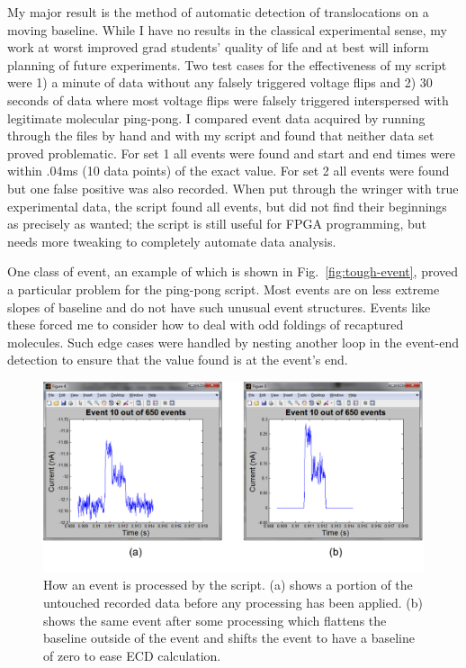 \documentclass[aps,prl,preprint,groupedaddress]{revtex4}
\begin{document}
My major result is the method of automatic detection of translocations on a moving baseline.
While I have no results in the classical experimental sense, my work at worst improved grad students' quality of life and at best will inform planning of future experiments.
Two test cases for the effectiveness of my script were 1) a minute of data without any falsely triggered voltage flips and 2) 30 seconds of data where most voltage flips were falsely triggered interspersed with legitimate molecular ping-pong.
I compared event data acquired by running through the files by hand and with my script and found that neither data set proved problematic.
For set 1 all events were found and start and end times were within .04ms (10 data points) of the exact value.
For set 2 all events were found but one false positive was also recorded.
When put through the wringer with true experimental data, the script found all events, but did not find their beginnings as precisely as wanted;
the script is still useful for FPGA programming, but needs more tweaking to completely automate data analysis.

One class of event, an example of which is shown in Fig.~\ref{fig:tough-event}, proved a particular problem for the ping-pong script.
Most events are on less extreme slopes of baseline and do not have such unusual event structures.
Events like these forced me to consider how to deal with odd foldings of recaptured molecules.
Such edge cases were handled by nesting another loop in the event-end detection to ensure that the value found is at the event's end.

\begin{figure}[H]
\centering
\includegraphics[width=1\textwidth]{figures/event-processing}
\caption{How an event is processed by the script. (a) shows a portion of the untouched recorded data before any processing has been applied.
(b) shows the same event after some processing which flattens the baseline outside of the event and shifts the event to have a baseline of zero to ease ECD calculation.}
\label{fig:event-analysis}
\end{figure}
\end{document}
